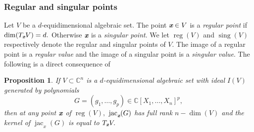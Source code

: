 \documentclass[a4paper]{article}
\def\Xb{\textit{\textbf{X}}}
\def\xb{\textit{\textbf{x}}}
\def\fb{\textit{\textbf{f}}}
\DeclareMathOperator{\sing}{sing}
\DeclareMathOperator{\jac}{jac}
\DeclareMathOperator{\reg}{reg}
\def\minors{\textrm{Minors}(F,p)}
\def\pa{\partial}
\def\C{\mathbb{C}}
\def\Wi{W(\pi_i,V)}
\def\Ii{\mathfrak{I}(i,F)}
\def\td{{\bf todo}}
\newtheorem{prop}[theorem]{Proposition}
\begin{document}
\subsubsection{Regular and singular points}
%
Let $V$ be a $d$-equidimensional algebraic set. 
The point $\xb \in V$ is a \textit{regular point} if $\dim (T_{\xb}V) = d.$ Otherwise $\xb$ is a \textit{singular point}. We let $\reg(V)$ and $\sing(V)$ respectively denote the regular and singular points of $V$. The image of a regular point is a \textit{regular value} and the image of a singular point is a \textit{singular value}.
%
The following is a direct consequence of \cite[Corollary 16.20]{ECA}
%
\begin{prop}
If $V \subset \C^n$ is a $d$-equidimensional algebraic set with ideal $I(V)$ generated by polynomials 
\[
G=(g_1,\hdots,g_p) \in \C[X_1,\hdots,X_n]^p,
\]
then at any point $\xb$ of $\reg(V),$ $\jac_{\xb}(G)$ has full rank $n - \dim(V)$ and the kernel of $\jac_x(G)$ is equal to $T_{\xb}V.$ 
\end{prop}
%



%
%
%
%
%
\end{document}
